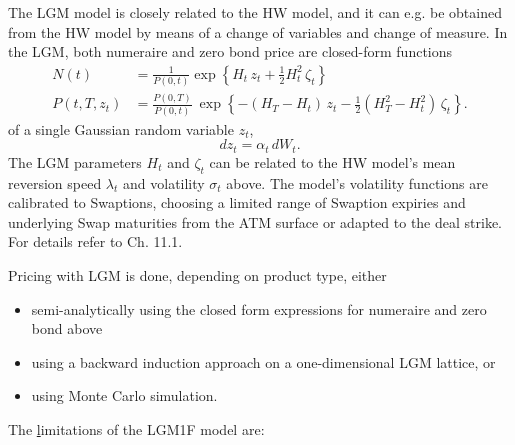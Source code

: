 The LGM model is closely related to the HW model, and it can e.g. be
obtained from the HW model by means of a change of variables and change of measure.
In the LGM, both numeraire and zero bond price are closed-form functions
\begin{align*}
N(t) &= \frac{1}{P(0,t)}\exp\left\{H_t\, z_t + \frac{1}{2}H^2_t\,\zeta_t \right\} \\
P(t,T,z_t)
&= \frac{P(0,T)}{P(0,t)}\:\exp\left\{ -(H_T-H_t)\,z_t - \frac{1}{2} \left(H^2_T-H^2_t\right)\,\zeta_t\right\}.
\end{align*}
of a single Gaussian random variable $z_t$,
$$
dz_t=\alpha_t\, dW_t.
$$
The LGM parameters $H_t$ and $\zeta_t$ can be related to the HW
model's mean reversion speed $\lambda_t$ and volatility $\sigma_t$ above.
The model's volatility functions are calibrated to Swaptions, choosing
a limited range of Swaption expiries and underlying Swap maturities from the
ATM surface or adapted to the deal strike. %
%
For details refer to \cite{LSG_2015} Ch. 11.1.

\medskip
Pricing with LGM is done, depending on product type, either
\begin{itemize}
\item semi-analytically using the closed form expressions for numeraire and
zero bond above
\item using a backward induction approach on a one-dimensional
LGM lattice, or
\item using Monte Carlo simulation.
\end{itemize}

The {\underline limitations} of the LGM1F model are:

